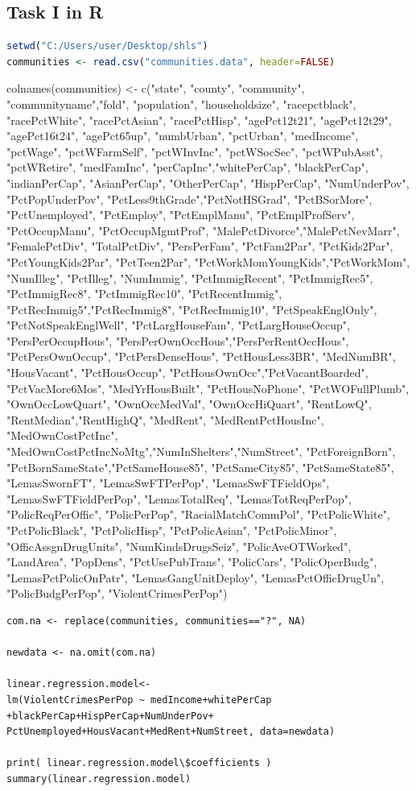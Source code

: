 \documentclass[10pt,a4paper]{article}
\begin{document}
	\subsection{Task I in R}
	\begin{lstlisting}[language=R]
setwd("C:/Users/user/Desktop/shls")
communities <- read.csv("communities.data", header=FALSE)
	\end{lstlisting}
colnames(communities) <- c("state", "county", "community", "communityname","fold", "population", "householdsize", "racepctblack", "racePctWhite", 
	"racePctAsian", "racePctHisp", "agePct12t21", "agePct12t29", "agePct16t24", "agePct65up", "numbUrban", "pctUrban", "medIncome", "pctWage", "pctWFarmSelf", "pctWInvInc", "pctWSocSec", "pctWPubAsst", "pctWRetire", "medFamInc", "perCapInc","whitePerCap", "blackPerCap", "indianPerCap", "AsianPerCap", "OtherPerCap", "HispPerCap", "NumUnderPov", "PctPopUnderPov", "PctLess9thGrade","PctNotHSGrad", "PctBSorMore", "PctUnemployed", "PctEmploy", "PctEmplManu", "PctEmplProfServ", "PctOccupManu", "PctOccupMgmtProf", "MalePctDivorce","MalePctNevMarr", "FemalePctDiv", "TotalPctDiv", "PersPerFam", "PctFam2Par", "PctKids2Par", "PctYoungKids2Par", "PctTeen2Par", "PctWorkMomYoungKids","PctWorkMom", "NumIlleg", "PctIlleg", "NumImmig", "PctImmigRecent", "PctImmigRec5", "PctImmigRec8", "PctImmigRec10", "PctRecentImmig", "PctRecImmig5","PctRecImmig8", "PctRecImmig10", "PctSpeakEnglOnly", "PctNotSpeakEnglWell", "PctLargHouseFam", "PctLargHouseOccup", "PersPerOccupHous", "PersPerOwnOccHous","PersPerRentOccHous", "PctPersOwnOccup", "PctPersDenseHous", "PctHousLess3BR", "MedNumBR", "HousVacant", "PctHousOccup", "PctHousOwnOcc","PctVacantBoarded", 
	"PctVacMore6Mos", "MedYrHousBuilt", "PctHousNoPhone", "PctWOFullPlumb", "OwnOccLowQuart", "OwnOccMedVal", "OwnOccHiQuart", "RentLowQ", "RentMedian","RentHighQ", "MedRent", "MedRentPctHousInc", "MedOwnCostPctInc", "MedOwnCostPctIncNoMtg","NumInShelters","NumStreet", "PctForeignBorn", "PctBornSameState","PctSameHouse85", "PctSameCity85", "PctSameState85", "LemasSwornFT", "LemasSwFTPerPop", "LemasSwFTFieldOps", "LemasSwFTFieldPerPop", "LemasTotalReq", 
	"LemasTotReqPerPop", "PolicReqPerOffic", "PolicPerPop", "RacialMatchCommPol", "PctPolicWhite", "PctPolicBlack", "PctPolicHisp", "PctPolicAsian", "PctPolicMinor", "OfficAssgnDrugUnits", "NumKindsDrugsSeiz", "PolicAveOTWorked", "LandArea", "PopDens", "PctUsePubTrans", "PolicCars", "PolicOperBudg", 
	"LemasPctPolicOnPatr", "LemasGangUnitDeploy", "LemasPctOfficDrugUn", "PolicBudgPerPop", "ViolentCrimesPerPop")\\
	\begin{lstlisting}	
com.na <- replace(communities, communities=="?", NA)
		
newdata <- na.omit(com.na)
		
linear.regression.model<-
lm(ViolentCrimesPerPop ~ medIncome+whitePerCap
+blackPerCap+HispPerCap+NumUnderPov+
PctUnemployed+HousVacant+MedRent+NumStreet, data=newdata)
		
print( linear.regression.model\$coefficients )
summary(linear.regression.model)
	\end{lstlisting}
\end{document}
